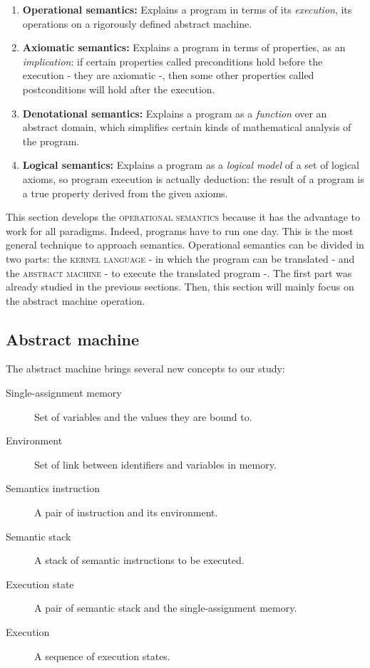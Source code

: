 \documentclass[11pt,a4paper,twoside,openright]{report}
\begin{document}
\begin{enumerate}
	\item \textbf{Operational semantics:} Explains a program in terms of 
its \textit{execution}, its operations on a rigorously defined abstract machine.
	\item \textbf{Axiomatic semantics:} Explains a program in terms of 
properties, as an \textit{implication}: if certain properties called 
preconditions hold before the execution - they are axiomatic -, then some other 
properties called postconditions will hold after the execution.
	\item \textbf{Denotational semantics:} Explains a program as a 
\textit{function} over an abstract domain, which simplifies certain kinds of 
mathematical analysis of the program.
	\item \textbf{Logical semantics:} Explains a program as a 
\textit{logical model} of a set of logical axioms, so program execution is 
actually deduction: the result of a program is a true property derived from 
the 
given axioms.
\end{enumerate}

This section develops the \textsc{operational semantics} because it has the 
advantage to work for all paradigms. Indeed, programs have to run one day. This 
is the most general technique to approach semantics. Operational semantics can 
be divided in two parts: the \textsc{kernel language} - in which the program can 
be translated - and the \textsc{abstract machine} - to execute the translated 
program -. The first part was already studied in the previous sections. Then, 
this section will mainly focus on the abstract machine operation.

\subsection{Abstract machine}

The abstract machine brings several new concepts to our study:
\begin{description}
	\item[Single-assignment memory] Set of variables and the values they 
are bound to.
	\item[Environment] Set of link between identifiers and variables in 
memory.
	\item[Semantics instruction] A pair of instruction and its environment.
	\item[Semantic stack] A stack of semantic instructions to be executed.
	\item[Execution state] A pair of semantic stack and the 
single-assignment memory.
	\item[Execution] A sequence of execution states.  
\end{description}
\end{document}
